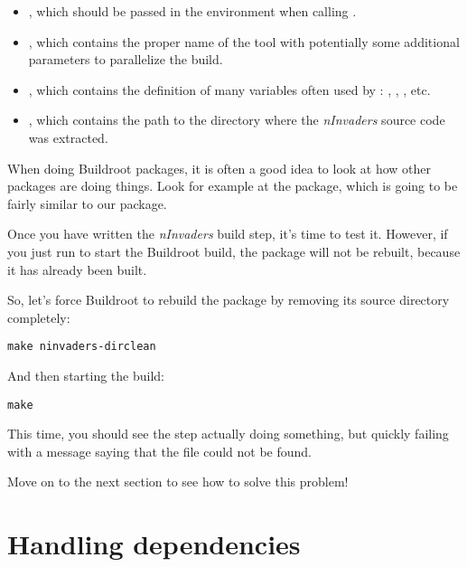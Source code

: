 \begin{itemize}

\item {}, which should be passed in the
  environment when calling .

\item {}, which contains the proper name of the 
  tool with potentially some additional parameters to parallelize the
  build.

\item {}, which contains the definition of
  many variables often used by : ,
  , , etc.

\item {}, which contains the path to the directory where the
  {\em nInvaders} source code was extracted.

\end{itemize}

When doing Buildroot packages, it is often a good idea to look at how
other packages are doing things. Look for example at the 
package, which is going to be fairly similar to our 
package.

Once you have written the {\em nInvaders} build step, it's time to
test it. However, if you just run  to start the Buildroot
build, the  package will not be rebuilt, because it
has already been built.

So, let's force Buildroot to rebuild the package by removing its
source directory completely:

\begin{verbatim}
make ninvaders-dirclean
\end{verbatim}

And then starting the build:

\begin{verbatim}
make
\end{verbatim}

This time, you should see the  step
actually doing something, but quickly failing with a message saying
that the  file could not be found.

Move on to the next section to see how to solve this problem!

\section{Handling dependencies}

